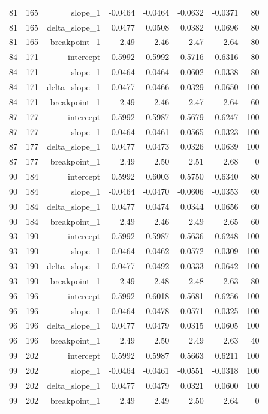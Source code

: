 {\begin{longtable}{lrrrrrrr}
  81 & 165 & slope\_1 & -0.0464 & -0.0464 & -0.0632 & -0.0371 & 80 \\
  81 & 165 & delta\_slope\_1 & 0.0477 & 0.0508 & 0.0382 & 0.0696 & 80 \\
  81 & 165 & breakpoint\_1 & 2.49 & 2.46 & 2.47 & 2.64 & 80 \\
  84 & 171 & intercept & 0.5992 & 0.5992 & 0.5716 & 0.6316 & 80 \\
  84 & 171 & slope\_1 & -0.0464 & -0.0464 & -0.0602 & -0.0338 & 80 \\
  84 & 171 & delta\_slope\_1 & 0.0477 & 0.0466 & 0.0329 & 0.0650 & 100 \\
  84 & 171 & breakpoint\_1 & 2.49 & 2.46 & 2.47 & 2.64 & 60 \\
  87 & 177 & intercept & 0.5992 & 0.5987 & 0.5679 & 0.6247 & 100 \\
  87 & 177 & slope\_1 & -0.0464 & -0.0461 & -0.0565 & -0.0323 & 100 \\
  87 & 177 & delta\_slope\_1 & 0.0477 & 0.0473 & 0.0326 & 0.0639 & 100 \\
  87 & 177 & breakpoint\_1 & 2.49 & 2.50 & 2.51 & 2.68 & 0 \\
  90 & 184 & intercept & 0.5992 & 0.6003 & 0.5750 & 0.6340 & 80 \\
  90 & 184 & slope\_1 & -0.0464 & -0.0470 & -0.0606 & -0.0353 & 60 \\
  90 & 184 & delta\_slope\_1 & 0.0477 & 0.0474 & 0.0344 & 0.0656 & 60 \\
  90 & 184 & breakpoint\_1 & 2.49 & 2.46 & 2.49 & 2.65 & 60 \\
  93 & 190 & intercept & 0.5992 & 0.5987 & 0.5636 & 0.6248 & 100 \\
  93 & 190 & slope\_1 & -0.0464 & -0.0462 & -0.0572 & -0.0309 & 100 \\
  93 & 190 & delta\_slope\_1 & 0.0477 & 0.0492 & 0.0333 & 0.0642 & 100 \\
  93 & 190 & breakpoint\_1 & 2.49 & 2.48 & 2.48 & 2.63 & 80 \\
  96 & 196 & intercept & 0.5992 & 0.6018 & 0.5681 & 0.6256 & 100 \\
  96 & 196 & slope\_1 & -0.0464 & -0.0478 & -0.0571 & -0.0325 & 100 \\
  96 & 196 & delta\_slope\_1 & 0.0477 & 0.0479 & 0.0315 & 0.0605 & 100 \\
  96 & 196 & breakpoint\_1 & 2.49 & 2.50 & 2.49 & 2.63 & 40 \\
  99 & 202 & intercept & 0.5992 & 0.5987 & 0.5663 & 0.6211 & 100 \\
  99 & 202 & slope\_1 & -0.0464 & -0.0461 & -0.0551 & -0.0318 & 100 \\
  99 & 202 & delta\_slope\_1 & 0.0477 & 0.0479 & 0.0321 & 0.0600 & 100 \\
  99 & 202 & breakpoint\_1 & 2.49 & 2.49 & 2.50 & 2.64 & 0 \\
\end{longtable}
}
